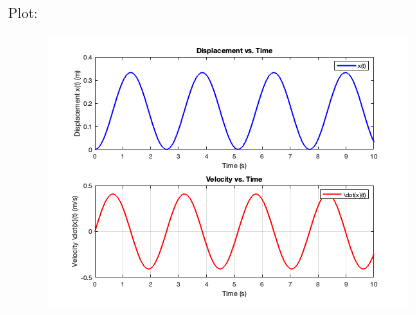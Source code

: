 \begin{homeworkProblem}
	Plot:
	\begin{figure}[ht]
		\begin{center}
			\includegraphics[width=0.85\textwidth]{images/s8.png}
		\end{center}
	\end{figure}

\end{homeworkProblem}



